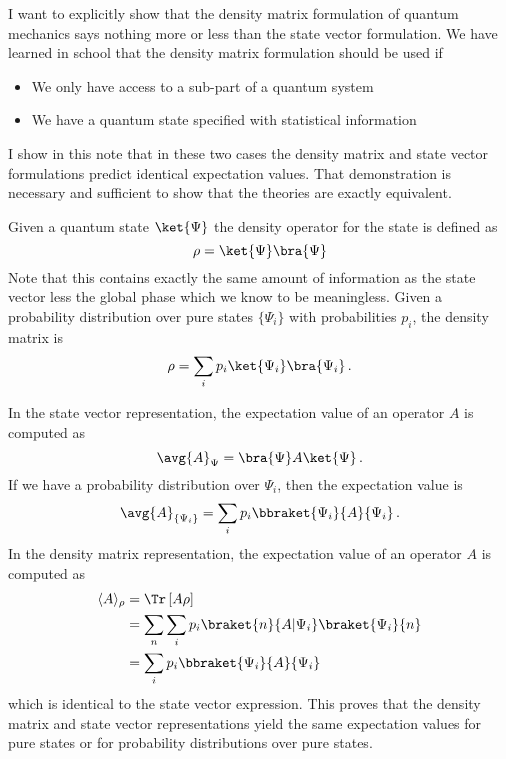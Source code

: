 
I want to explicitly show that the density matrix formulation of quantum mechanics says nothing more or less than the state vector formulation. We have learned in school that the density matrix formulation should be used if

\begin{itemize}
\item We only have access to a sub-part of a quantum system
\item We have a quantum state specified with statistical information
\end{itemize}

I show in this note that in these two cases the density matrix and state vector formulations predict identical expectation values. That demonstration is necessary and sufficient to show that the theories are exactly equivalent.


Given a quantum state $\ket{\Psi}$ the density operator for the state is defined as \begin{equation}
\rho = \ket{\Psi}\bra{\Psi} \end{equation}
Note that this contains exactly the same amount of information as the state vector less the global phase which we know to be meaningless.
Given a probability distribution over pure states $\{\Psi_i\}$ with probabilities $p_i$, the density matrix is
\begin{equation*}
  \rho = \sum_i p_i \ket{\Psi_i}\bra{\Psi_i} \, .
\end{equation*}



In the state vector representation, the expectation value of an operator $A$ is computed as
\begin{equation}
  \avg{A}_\Psi = \bra{\Psi}A\ket{\Psi} \, .
\end{equation}
If we have a probability distribution over $\Psi_i$, then the expectation value is
\begin{equation*}
  \avg{A}_{\{\Psi_i\}} = \sum_i p_i \bbraket{\Psi_i}{A}{\Psi_i} \, .
\end{equation*}
In the density matrix representation, the expectation value of an operator $A$ is computed as
\begin{align*}
  \langle A \rangle_{\rho} &= \Tr \left[ A \rho \right] \\
  &= \sum_n \sum_i p_i \braket{n}{A|\Psi_i}\braket{\Psi_i}{n} \\
  &= \sum_i p_i \bbraket{\Psi_i}{A}{\Psi_i} \\
\end{align*}
which is identical to the state vector expression.
This proves that the density matrix and state vector representations yield the same expectation values for pure states or for probability distributions over pure states.

